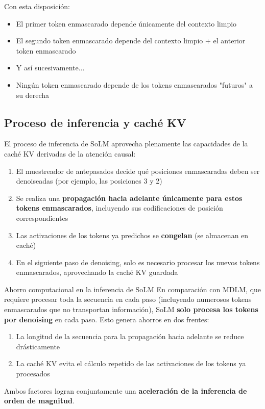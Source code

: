\documentclass[a4paper]{article}
\begin{document}
Con esta disposición:
\begin{itemize}
    \item El primer token enmascarado depende únicamente del contexto limpio
    \item El segundo token enmascarado depende del contexto limpio + el anterior token enmascarado
    \item Y así sucesivamente...
    \item Ningún token enmascarado depende de los tokens enmascarados "futuros" a su derecha
\end{itemize}

\subsection{Proceso de inferencia y caché KV}

El proceso de inferencia de SoLM aprovecha plenamente las capacidades de la caché KV derivadas de la atención causal:

\begin{enumerate}
    \item El muestreador de antepasados decide qué posiciones enmascaradas deben ser denoiseadas (por ejemplo, las posiciones 3 y 2)
    \item Se realiza una \textbf{propagación hacia adelante únicamente para estos tokens enmascarados}, incluyendo sus codificaciones de posición correspondientes
    \item Las activaciones de los tokens ya predichos se \textbf{congelan} (se almacenan en caché)
    \item En el siguiente paso de denoising, solo es necesario procesar los nuevos tokens enmascarados, aprovechando la caché KV guardada
\end{enumerate}

\begin{importantbox}{Ahorro computacional en la inferencia de SoLM}
En comparación con MDLM, que requiere procesar toda la secuencia en cada paso (incluyendo numerosos tokens enmascarados que no transportan información), SoLM \textbf{solo procesa los tokens por denoising} en cada paso. Esto genera ahorros en dos frentes:
\begin{enumerate}
    \item La longitud de la secuencia para la propagación hacia adelante se reduce drásticamente
    \item La caché KV evita el cálculo repetido de las activaciones de los tokens ya procesados
\end{enumerate}
Ambos factores logran conjuntamente una \textbf{aceleración de la inferencia de orden de magnitud}.
\end{importantbox}
\end{document}
